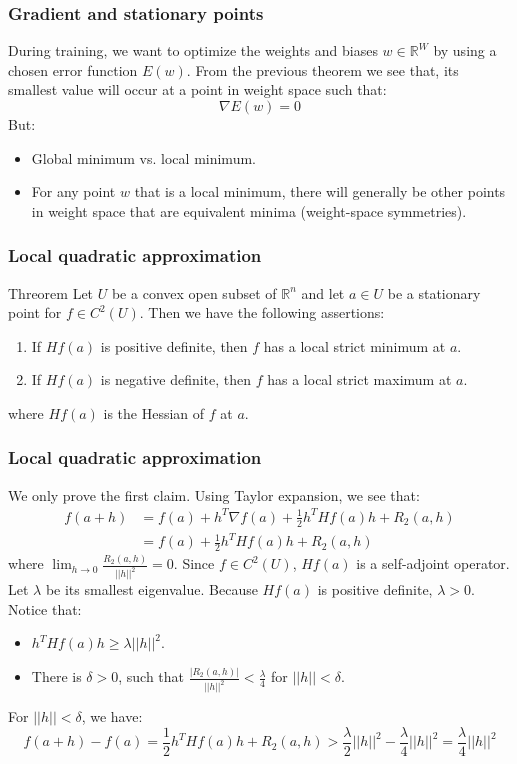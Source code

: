 \documentclass{beamer}
\begin{document}
\begin{frame}
    \frametitle{Gradient and stationary points}
    During training, we want to optimize the weights and biases $w\in\mathbb{R}^{W}$ by using a chosen error function $E(w)$. From the previous theorem we see that, its smallest value will occur at a point in weight space such that:
    \begin{equation*}
        \nabla{}E(w)=0
    \end{equation*}
    But:
    \begin{itemize}
        \item Global minimum vs. local minimum.
        \item For any point $w$ that is a local minimum, there will generally be other points in weight space that are equivalent minima (weight-space symmetries).
    \end{itemize}
\end{frame}

\begin{frame}
    \frametitle{Local quadratic approximation}
    \begin{block}{Threorem}
        Let $U$ be a convex open subset of $\mathbb{R}^{n}$ and let $a\in{}U$ be a stationary point for $f\in{}C^{2}(U)$. Then we have the following assertions:
        \begin{enumerate}
            \item If $Hf(a)$ is positive definite, then $f$ has a local strict minimum at $a$.
            \item If $Hf(a)$ is negative definite, then $f$ has a local strict maximum at $a$.
        \end{enumerate}
        where $Hf(a)$ is the Hessian of $f$ at $a$.
    \end{block}
\end{frame}

\begin{frame}
    \frametitle{Local quadratic approximation}
    We only prove the first claim. Using Taylor expansion, we see that:
    \begin{align*}
        f(a+h)&=f(a)+h^{T}\nabla{}f(a)+\frac{1}{2}h^{T}Hf(a)h+R_{2}(a,h) \\
        &=f(a)+\frac{1}{2}h^{T}Hf(a)h+R_{2}(a,h)
    \end{align*}
    where $\lim_{h\to{}0}\frac{R_{2}(a,h)}{||h||^{2}}=0$. Since $f\in{}C^{2}(U)$, $Hf(a)$ is a self-adjoint operator. Let $\lambda$ be its smallest eigenvalue. Because $Hf(a)$ is positive definite, $\lambda>0$. Notice that:
    \begin{itemize}
        \item $h^{T}Hf(a)h\ge\lambda||h||^{2}$.
        \item There is $\delta>0$, such that $\frac{|R_{2}(a,h)|}{||h||^{2}}<\frac{\lambda}{4}$ for $||h||<\delta$.
    \end{itemize}
    For $||h||<\delta$, we have:
    \begin{equation*}
        f(a+h)-f(a)=\frac{1}{2}h^{T}Hf(a)h+R_{2}(a,h)>\frac{\lambda}{2}||h||^{2}-\frac{\lambda}{4}||h||^{2}=\frac{\lambda}{4}||h||^{2}
    \end{equation*}
\end{frame}
\end{document}
